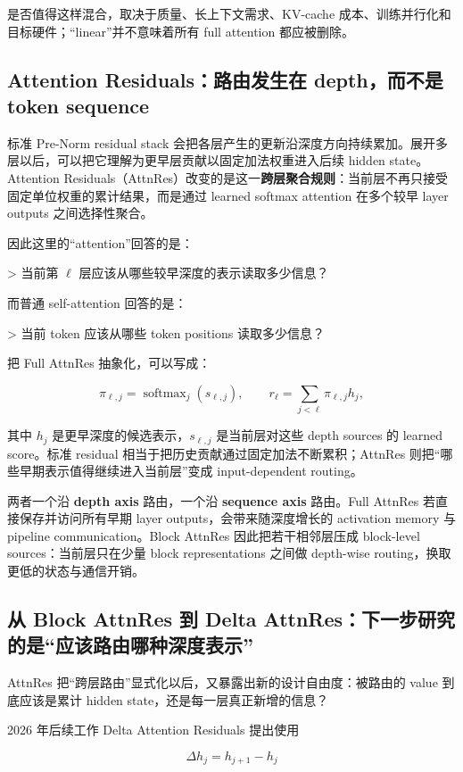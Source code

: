 \documentclass[profile=standard,twoside=false]{ipara-handbook}
\begin{document}
是否值得这样混合，取决于质量、长上下文需求、KV-cache 成本、训练并行化和目标硬件；“linear”并不意味着所有 full attention 都应被删除。

\subsection{Attention Residuals：路由发生在 depth，而不是 token sequence}

标准 Pre-Norm residual stack 会把各层产生的更新沿深度方向持续累加。展开多层以后，可以把它理解为更早层贡献以固定加法权重进入后续 hidden state。Attention Residuals（AttnRes）改变的是这一\textbf{跨层聚合规则}：当前层不再只接受固定单位权重的累计结果，而是通过 learned softmax attention 在多个较早 layer outputs 之间选择性聚合。

因此这里的“attention”回答的是：

> 当前第 $\ell$ 层应该从哪些较早深度的表示读取多少信息？

而普通 self-attention 回答的是：

> 当前 token 应该从哪些 token positions 读取多少信息？

把 Full AttnRes 抽象化，可以写成：

$$
\pi_{\ell,j}
=\operatorname{softmax}_j(s_{\ell,j}),
\qquad
r_\ell
=\sum_{j<\ell}\pi_{\ell,j}h_j,
$$

其中 $h_j$ 是更早深度的候选表示，$s_{\ell,j}$ 是当前层对这些 depth sources 的 learned score。标准 residual 相当于把历史贡献通过固定加法不断累积；AttnRes 则把“哪些早期表示值得继续进入当前层”变成 input-dependent routing。

两者一个沿 \textbf{depth axis} 路由，一个沿 \textbf{sequence axis} 路由。Full AttnRes 若直接保存并访问所有早期 layer outputs，会带来随深度增长的 activation memory 与 pipeline communication。Block AttnRes 因此把若干相邻层压成 block-level sources：当前层只在少量 block representations 之间做 depth-wise routing，换取更低的状态与通信开销。

\subsection{从 Block AttnRes 到 Delta AttnRes：下一步研究的是“应该路由哪种深度表示”}

AttnRes 把“跨层路由”显式化以后，又暴露出新的设计自由度：被路由的 value 到底应该是累计 hidden state，还是每一层真正新增的信息？

2026 年后续工作 Delta Attention Residuals 提出使用

$$
\boxed{
\Delta h_j=h_{j+1}-h_j
}
$$
\end{document}
